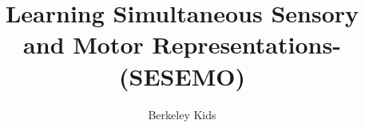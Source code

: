 \documentclass[conference]{IEEEtran}
\begin{document}
\title{Learning Simultaneous Sensory and Motor Representations- (SESEMO)}

\author{Berkeley Kids}





% 


\maketitle
\end{document}
